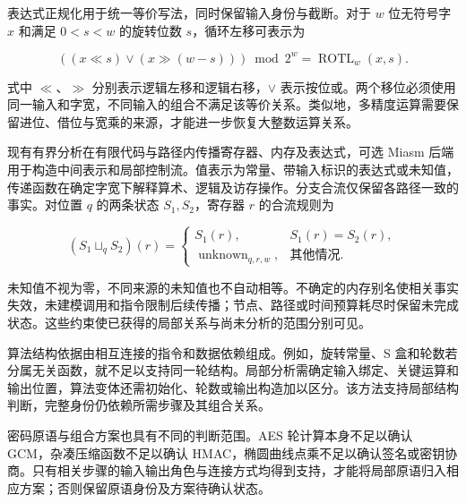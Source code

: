 表达式正规化用于统一等价写法，同时保留输入身份与截断。对于 $w$ 位无符号字 $x$ 和满足 $0<s<w$ 的旋转位数 $s$，循环左移可表示为

\begin{equation}
  ((x\ll s)\lor(x\gg(w-s)))\bmod2^w
  =\operatorname{ROTL}_w(x,s).
\end{equation}

式中 $\ll$、$\gg$ 分别表示逻辑左移和逻辑右移，$\lor$ 表示按位或。两个移位必须使用同一输入和字宽，不同输入的组合不满足该等价关系。类似地，多精度运算需要保留进位、借位与宽乘的来源，才能进一步恢复大整数运算关系。

现有有界分析在有限代码与路径内传播寄存器、内存及表达式，可选 Miasm 后端用于构造中间表示和局部控制流\cite{miasm}。值表示为常量、带输入标识的表达式或未知值，传递函数在确定字宽下解释算术、逻辑及访存操作。分支合流仅保留各路径一致的事实。对位置 $q$ 的两条状态 $S_1,S_2$，寄存器 $r$ 的合流规则为

\begin{equation}
  (S_1\sqcup_q S_2)(r)=
  \begin{cases}
    S_1(r),&S_1(r)=S_2(r),\\
    \operatorname{unknown}_{q,r,w},&\text{其他情况}.
  \end{cases}
  \label{eq:semantic-state-join}
\end{equation}

未知值不视为零，不同来源的未知值也不自动相等。不确定的内存别名使相关事实失效，未建模调用和指令限制后续传播；节点、路径或时间预算耗尽时保留未完成状态。这些约束使已获得的局部关系与尚未分析的范围分别可见。

算法结构依据由相互连接的指令和数据依赖组成。例如，旋转常量、S 盒和轮数若分属无关函数，就不足以支持同一轮结构。局部分析需确定输入绑定、关键运算和输出位置，算法变体还需初始化、轮数或输出构造加以区分。该方法支持局部结构判断，完整身份仍依赖所需步骤及其组合关系。

密码原语与组合方案也具有不同的判断范围。AES 轮计算本身不足以确认 GCM，杂凑压缩函数不足以确认 HMAC，椭圆曲线点乘不足以确认签名或密钥协商。只有相关步骤的输入输出角色与连接方式均得到支持，才能将局部原语归入相应方案；否则保留原语身份及方案待确认状态。


